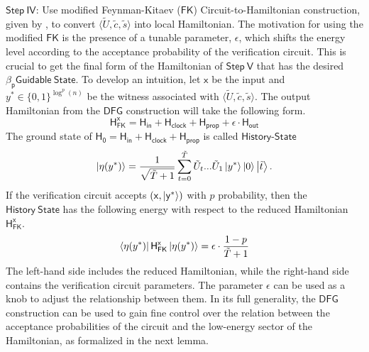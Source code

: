 \documentclass[11pt]{article}
\begin{document}
$\mathsf{Step\ IV}$: Use modified Feynman-Kitaev ($\mathsf{FK}$) Circuit-to-Hamiltonian construction, given by \cite{deshpande2022importance}, to convert $\langle \tilde{U},\tilde{c}, \tilde{s} \rangle$ into local Hamiltonian. The motivation for using the modified $\mathsf{FK}$ is the presence of a tunable parameter, $\epsilon$, which shifts the energy level according to the acceptance probability of the verification circuit. This is crucial to get the final form of the Hamiltonian of $\mathsf{Step\ V}$ that has the desired $\mathsf{\beta_p Guidable\ State}$. To develop an intuition, let $\mathsf{x}$ be the input and $y^* \in \{0,1\}^{\log^p(n)}$ be the witness associated with $\langle \tilde{U},\tilde{c}, \tilde{s} \rangle$. The output Hamiltonian from the $\mathsf{DFG}$ construction will take the following form.
\begin{equation}
    \mathsf{H_{FK}^x = H_{in}+H_{clock}+H_{prop} + \epsilon\cdot H_{out}} 
\end{equation}
 The ground state of $\mathsf{H_0 = H_{in} + H_{clock} + H_{prop}}$ is called $\mathsf{History}$-$\mathsf{State}$
\begin{equation}
    \ket{\eta({y^*})} =\frac{1}{\sqrt{\tilde{T}+1}}\sum_{t=0}^{\tilde{T}} \tilde{U}_t...\tilde{U}_1\ket{y^*} \ket{0}\ket{\tilde{t}}.
\end{equation}
If the verification circuit accepts $\mathsf{(x,\ket{y^*})}$ with $p$ probability, then the $\mathsf{History\ State}$ has the following energy with respect to the reduced Hamiltonian $\mathsf{H_{FK}^x}$.
\begin{equation}
    \bra{\eta({y^*})}\mathsf{H_{FK}^x}\ket{\eta({y^*})} = \epsilon \cdot \frac{1-p}{\tilde{T}+1}
\end{equation}
The left-hand side includes the reduced Hamiltonian, while the right-hand side contains the verification circuit parameters. The parameter $\epsilon$ can be used as a knob to adjust the relationship between them. In its full generality, the $\mathsf{DFG}$ construction can be used to gain fine control over the relation between the acceptance probabilities of the circuit and the low-energy sector of the Hamiltonian, as formalized in the next lemma.
\end{document}
